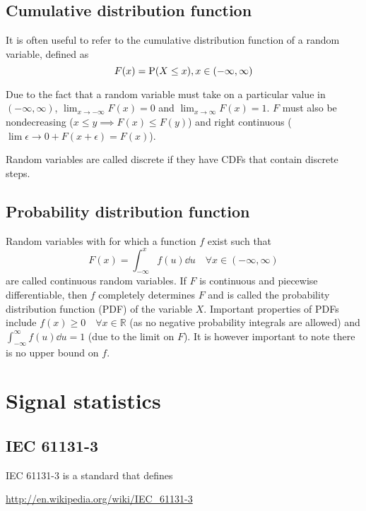 \subsection{Cumulative distribution function}
It is often useful to refer to the cumulative distribution function of a random variable, defined as 
\begin{equation}
  F(x) = \mathrm{P}(X \leq x), x \in (-\infty,\infty)
\end{equation}

Due to the fact that a random variable must take on a particular value in $(-\infty,\infty)$, $\lim_{x \to -\infty} F(x) = 0$ and $\lim_{x \to \infty} F(x) = 1$.
$F$ must also be nondecreasing ($x \leq y \implies F(x) \leq F(y)$) and right continuous ($\lim{\epsilon \to 0+} F(x+\epsilon) = F(x)$).

Random variables are called discrete if they have CDFs that contain discrete steps.

\subsection{Probability distribution function}
Random variables with for which a function $f$ exist such that 
\begin{equation}
  \label{eq:cdffrompdf}
  F(x) = \int_{-\infty}^xf(u)\dd u \quad \forall x \in (-\infty, \infty)
\end{equation}
are called continuous random variables.
If $F$ is continuous and piecewise differentiable, then $f$ completely determines $F$ and is called the probability distribution function (PDF) of the variable $X$.
Important properties of PDFs include $f(x) \geq 0 \quad \forall x \in \mathbb{R}$ (as no negative probability integrals are allowed) and $\int_{-\infty}^{\infty} f(u) \dd u = 1$ (due to the limit on $F$).  
It is however important to note there is no upper bound on $f$.

\section{Signal statistics}


\subsection{IEC 61131-3}
IEC 61131-3 is a standard that defines

\url{http://en.wikipedia.org/wiki/IEC_61131-3}


